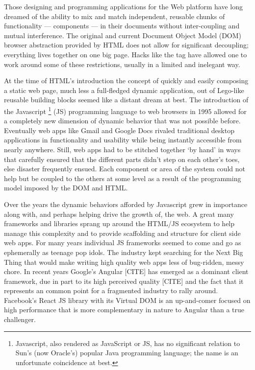 Those designing and programming applications for the Web platform have long dreamed of the ability to mix and match independent, reusable chunks of functionality --- components --- in their documents without inter-coupling and mutual interference. 
The original and current Document Object Model (DOM)
browser abstraction provided by HTML does not allow for significant decoupling; 
everything lives together on one big page. Hacks like the 
tag have allowed one to work around some of these restrictions, 
usually in a limited and inelegant way.

At the time of HTML's introduction the concept of quickly and easily composing a static web page, 
much less a full-fledged dynamic application, 
out of Lego-like reusable building blocks seemed like a distant dream at best. 
The introduction of the Javascript
\footnote[1]{Javascript, also rendered as JavaScript or JS, 
has no significant relation to Sun's (now Oracle's) popular Java programming language;
the name is an unfortunate coincidence at best.}
(JS) programming language to web browsers in 1995 allowed for a completely new dimension of dynamic behavior that was not possible before.
Eventually web apps like Gmail and Google Docs rivaled traditional desktop applications in functionality and usability while being instantly accessible from nearly anywhere.
Still, web apps had to be stitched together `by hand' in ways that carefully ensured that the different parts didn't step on each other's toes, else disaster frequently ensued. 
Each component or area of the system could not help but be coupled to the others at some level as a result of the programming model imposed by the DOM and HTML.

Over the years the dynamic behaviors afforded by Javascript grew in importance along with, and perhaps helping drive the growth of, the web. 
A great many frameworks and libraries sprang up around the HTML/JS ecosystem to help manage this complexity and to provide scaffolding and structure for client side web apps.
For many years individual JS frameworks seemed to come and go as ephemerally as teenage pop idols. 
The industry kept searching for the Next Big Thing that would make writing high quality web apps less of bug-ridden, messy chore. 
In recent years Google's Angular [CITE] 
has emerged as a dominant client framework, 
due in part to its high perceived quality [CITE] and the fact that it represents an common point for a fragmented industry to rally around.
Facebook's React 
JS library with its Virtual DOM is an up-and-comer focused on high performance that is more complementary in nature to Angular than a true challenger.

